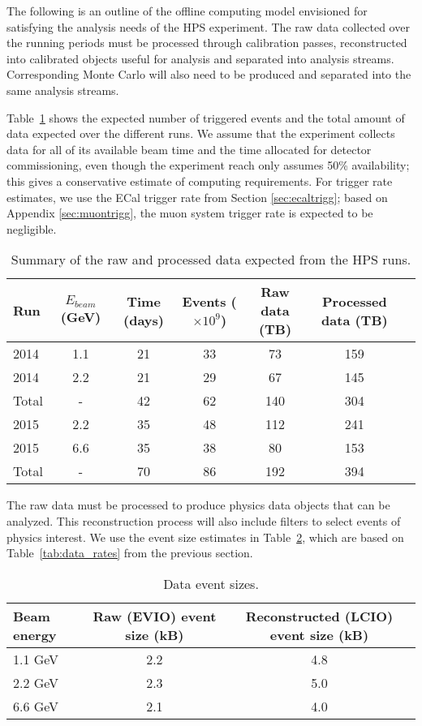 
The following is an outline of the offline computing model envisioned for satisfying the analysis needs of the HPS experiment. The raw data collected over the running periods must be processed through calibration passes, reconstructed into calibrated objects useful for analysis and separated into analysis streams. Corresponding Monte Carlo will also need to be produced and separated into the same analysis streams.

Table~\ref{tab:data_volume} shows the expected number of triggered events and
the total amount of data expected over the 
different runs. 
We assume that the experiment collects data for all of its available beam time and the time allocated for detector commissioning, even though the experiment reach only assumes 50\% availability; this gives a conservative estimate of computing requirements. 
For trigger rate estimates, we use the ECal trigger rate from Section \ref{sec:ecaltrigg}; based on Appendix \ref{sec:muontrigg}, the muon system trigger rate is expected to be negligible.
\begin{table}[]
\centering
\begin{tabular}{|l|c|c|c|c|c|c|}
\hline
Run & $E_{beam}$ (GeV) & Time (days) & Events ($\times 10^9$) & Raw data (TB) & Processed data (TB)\\
\hline
2014 & 1.1 & 21 & 33 & 73 & 159 \\
2014 & 2.2 & 21 & 29 & 67 & 145  \\
\hline
Total & - & 42 & 62 & 140 & 304 \\
\hline
2015 & 2.2 & 35 & 48 & 112 & 241 \\
2015 & 6.6 & 35 & 38 & 80 & 153 \\
\hline
Total & - & 70 & 86 & 192 & 394 \\
\hline
\end{tabular}
\caption{{\small Summary of the raw and processed data expected from the HPS runs. }}
\label{tab:data_volume}
\end{table}

The raw data must be processed to produce physics data objects that can be analyzed. 
This reconstruction process will also include filters to select events of physics interest. We use the event size estimates 
in Table~\ref{tab:raw_data_size}, which are based on Table~\ref{tab:data_rates} from the previous section. 
\begin{table}[]
\centering
\begin{tabular}{|l|c|c|}
\hline
Beam energy & Raw (EVIO) event size (kB) & Reconstructed (LCIO) event size (kB) \\ 
\hline
1.1 GeV  &  2.2 & 4.8 \\
2.2 GeV  &  2.3 & 5.0 \\
6.6 GeV  &  2.1 & 4.0 \\
\hline
\end{tabular}
\caption{{\small Data event sizes. }}
\label{tab:raw_data_size}
\end{table}

